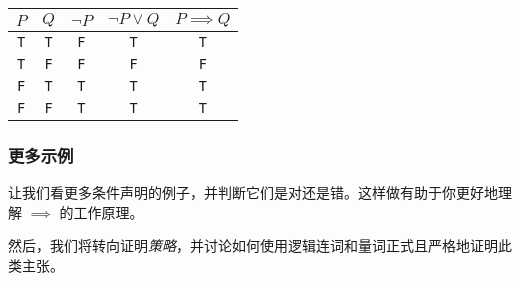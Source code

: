 \begin{center}
    \begin{tabular}{c|c|c|c|c}
          $P$      & $Q$      & $\neg P$ & $\neg P \lor Q$ & $P \implies Q$ \\
          \hline
          \verb|T| & \verb|T| & \verb|F| &     \verb|T|    &  \verb|T|   \\
          \verb|T| & \verb|F| & \verb|F| &     \verb|F|    &  \verb|F|   \\
          \verb|F| & \verb|T| & \verb|T| &     \verb|T|    &  \verb|T|   \\
          \verb|F| & \verb|F| & \verb|T| &     \verb|T|    &  \verb|T|   \\
    \end{tabular}
\end{center}

\subsubsection*{更多示例}

让我们看更多条件声明的例子，并判断它们是对还是错。这样做有助于你更好地理解 $\implies$ 的工作原理。

然后，我们将转向证明\emph{策略}，并讨论如何使用逻辑连词和量词正式且严格地证明此类主张。\\

